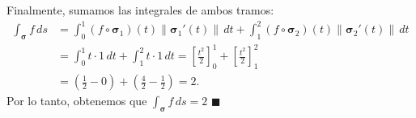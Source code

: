 \noindent Finalmente, sumamos las integrales de ambos tramos:
\begin{align*}
\int_{\boldsymbol{\sigma}} f\, ds &= \int_{0}^{1}   (f \circ \boldsymbol{\sigma}_1) (t)  \|\boldsymbol{\sigma}_1'(t)\| \, dt + \int_{1}^{2}  (f \circ \boldsymbol{\sigma}_2) (t)  \|\boldsymbol{\sigma}_2'(t)\| \, dt \\[0.2cm]
&= \int_{0}^{1} t \cdot 1 \, dt + \int_{1}^{2} t \cdot 1 \, dt  = \left[ \frac{t^2}{2} \right]_{0}^{1} + \left[ \frac{t^2}{2} \right]_{1}^{2} \\[0.2cm]
&= \left( \frac{1}{2} - 0 \right) + \left( \frac{4}{2} - \frac{1}{2} \right) = 2.
\end{align*}
Por lo tanto, obtenemos que $\int_{\boldsymbol{\sigma}} f\, ds =  2$  \hfill $\blacksquare$






